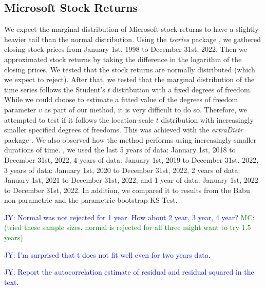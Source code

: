 \documentclass[12pt, titlepage, letterpaper]{article}
\newcommand{\jy}[1]{\textcolor{blue}{JY: #1}}
\newcommand{\mc}[1]{\textcolor{green}{MC: (#1)}}
\begin{document}
{\subsection{Microsoft Stock Returns}
\label{sec:microsoft}


We expect the marginal distribution of Microsoft stock returns to have a 
slightly
heavier tail than the normal distribution. Using the \textsl{tseries} package 
\citep{tseries}, 
we gathered closing stock prices from January 1st, 1998 to December 31st, 2022.
Then we approximated stock returns by taking the difference in the logarithm 
of the closing prices.
We tested that the stock returns are normally
distributed (which we expect to reject).  After that, we tested that the
marginal distribution of the time series follows the Student's $t$ distribution
with a fixed degrees of freedom.
While we 
could choose to estimate a fitted value of the degrees of freedom parameter $v$
as
part of our method, it is very difficult to do so. Therefore, we attempted to
test 
if it follows
the location-scale $t$ distribution with increasingly smaller specified degrees 
of freedoms. This was achieved with the \textsl{extraDistr} 
package \citep{extraDistr}. We
also observed how the method performs using increasingly smaller durations of
time. ,
we used the last 5 years of data: January 1st, 2018 to December 31st, 2022,
4 years of data: January 1st, 2019 to December 31st, 2022,
3 years of data: January 1st, 2020 to December 31st, 2022,
2 years of data: January 1st, 2021 to December 31st, 2022,
and 1 year of data: January 1st, 2022
to December 31st, 2022. In addition, we compared it to results from 
the Babu non-parametric and 
the parametric bootstrap KS Test.












\jy{Normal was not rejected for 1 year. How about 2 year, 3 year, 4 year?}
\mc{tried these sample sizes, normal is rejected for all three might want to
  try 1.5 years}

\jy{I'm surprised that t does not fit well even for two years data.}

\jy{Report the autocorrelation estimate of residual and residual squared in the
  text.}



}
\end{document}
